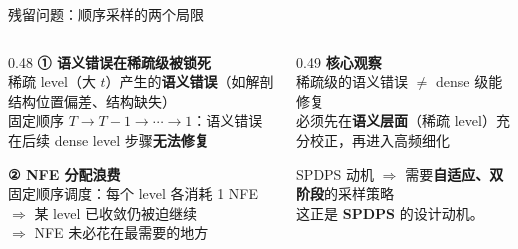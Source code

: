 \documentclass[aspectratio=169,10pt]{beamer}
\newcommand{\cnum}[1]{{\notocjk#1}}
\newcommand{\hterm}[1]{\textcolor{Brick}{\textbf{#1}}}
\begin{document}
\begin{frame}{残留问题：顺序采样的两个局限}
  \vspace{0.3em}
  \begin{columns}[T]
    \begin{column}{0.48\textwidth}
      \textbf{\cnum{①} 语义错误在稀疏级被锁死}
      \\[3pt]
      稀疏 level（大 $t$）产生的\hterm{语义错误}（如解剖结构位置偏差、结构缺失）
      \\[3pt]
      固定顺序 $T\!\to\!T\!-\!1\!\to\!\cdots\!\to\!1$：语义错误在后续 dense level 步骤\textbf{无法修复}
      \vspace{0.8em}

      \textbf{\cnum{②} NFE 分配浪费}
      \\[3pt]
      固定顺序调度：每个 level 各消耗 1 NFE
      \\[2pt]
      $\Rightarrow$ 某 level 已收敛仍被迫继续
      \\[2pt]
      $\Rightarrow$ NFE 未必花在最需要的地方
    \end{column}
    \begin{column}{0.49\textwidth}
      \textbf{核心观察}
      \\[3pt]
      稀疏级的语义错误 $\neq$ dense 级能修复
      \\[3pt]
      必须先在\hterm{语义层面}（稀疏 level）充分校正，再进入高频细化
      \vspace{1em}

      \begin{alertblock}{SPDPS 动机}
        $\Rightarrow$ 需要\textbf{自适应、双阶段}的采样策略
        \\[4pt]
        这正是 \textbf{SPDPS} 的设计动机。
      \end{alertblock}
    \end{column}
  \end{columns}
\end{frame}
\end{document}
